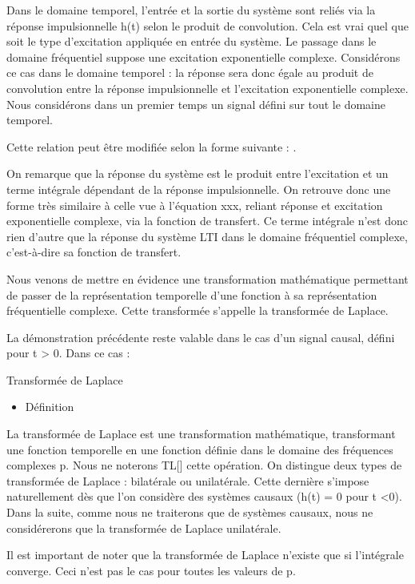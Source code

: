 \documentclass[]{article}
\begin{document}
Dans le domaine temporel, l'entrée et la sortie du système sont reliés
via la réponse impulsionnelle h(t) selon le produit de convolution. Cela
est vrai quel que soit le type d'excitation appliquée en entrée du
système. Le passage dans le domaine fréquentiel suppose une excitation
exponentielle complexe. Considérons ce cas dans le domaine temporel : la
réponse sera donc égale au produit de convolution entre la réponse
impulsionnelle et l'excitation exponentielle complexe. Nous considérons
dans un premier temps un signal défini sur tout le domaine temporel.

Cette relation peut être modifiée selon la forme suivante : .

On remarque que la réponse du système est le produit entre l'excitation
et un terme intégrale dépendant de la réponse impulsionnelle. On
retrouve donc une forme très similaire à celle vue à l'équation xxx,
reliant réponse et excitation exponentielle complexe, via la fonction de
transfert. Ce terme intégrale n'est donc rien d'autre que la réponse du
système LTI dans le domaine fréquentiel complexe, c'est-à-dire sa
fonction de transfert.

Nous venons de mettre en évidence une transformation mathématique
permettant de passer de la représentation temporelle d'une fonction à sa
représentation fréquentielle complexe. Cette transformée s'appelle la
transformée de Laplace.~

La démonstration précédente reste valable dans le cas d'un signal
causal, défini pour t \textgreater{} 0. Dans ce cas :

Transformée de Laplace

\begin{itemize}
\itemsep1pt\parskip0pt
\item
  Définition
\end{itemize}

La transformée de Laplace est une transformation mathématique,
transformant une fonction temporelle en une fonction définie dans le
domaine des fréquences complexes p. Nous ne noterons TL{[}{]} cette
opération. On distingue deux types de transformée de Laplace :
bilatérale ou unilatérale. Cette dernière s'impose naturellement dès que
l'on considère des systèmes causaux (h(t) = 0 pour t \textless{}0). Dans
la suite, comme nous ne traiterons que de systèmes causaux, nous ne
considérerons que la transformée de Laplace unilatérale.

Il est important de noter que la transformée de Laplace n'existe que si
l'intégrale converge. Ceci n'est pas le cas pour toutes les valeurs de
p.
\end{document}
